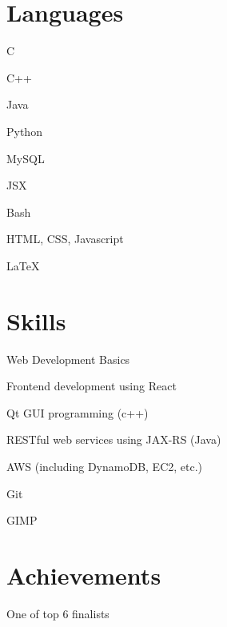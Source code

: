 \documentclass[]{deedy-resume-openfont}
\begin{document}
\begin{minipage}[t]{0.4\textwidth} 

\section{Languages} 
\hspace{0.5em}
\begin{tightemize}
\item C
\item C++
\item Java
\item Python
\end{tightemize}
\sectionsep
{}
\begin{tightemize}
\item MySQL
\item JSX
\item Bash
\item HTML, CSS, Javascript
\item \LaTeX
\end{tightemize}
\sectionsep

\section{Skills} 
\sectionsep
\begin{tightemize}
\item Web Development Basics
\item Frontend development using React
\item Qt GUI programming (c++)
\item RESTful web services using JAX-RS (Java)
\item AWS (including DynamoDB, EC2, etc.)
\item Git
\item GIMP
\end{tightemize}
\sectionsep



\section{Achievements}
\sectionsep
\begin{tightemize}

\item {}
One of top 6 finalists

\item {}


\end{tightemize}
\end{minipage}
\end{document}
